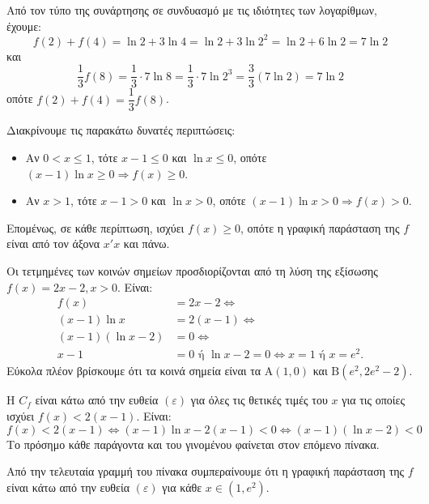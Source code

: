 \begin{alist}
\item Από τον τύπο της συνάρτησης σε συνδυασμό με τις ιδιότητες των λογαρίθμων, έχουμε:
\[f(2) + f(4) = \ln 2 + 3\ln 4 = \ln 2 + 3\ln 2^2 = \ln 2 + 6\ln 2 = 7\ln 2\]
και
\[\frac{1}{3}f(8) = \frac{1}{3}\cdot 7\ln 8 = \frac{1}{3}\cdot 7\ln 2^3 = \frac{3}{3}(7\ln 2) = 7\ln 2\]
οπότε $f(2) + f(4) = \dfrac{1}{3}f(8)$.
\item Διακρίνουμε τις παρακάτω δυνατές περιπτώσεις:
\begin{itemize}
    \item Αν $0 < x \le 1$, τότε $x - 1 \le 0$ και $\ln x \le 0$, οπότε $(x - 1)\ln x \ge 0 \Rightarrow f(x) \ge 0$.
    \item Αν $x > 1$, τότε $x - 1 > 0$ και $\ln x > 0$, οπότε $(x - 1)\ln x > 0 \Rightarrow f(x) > 0$.
\end{itemize}
Επομένως, σε κάθε περίπτωση, ισχύει $f(x) \ge 0$, οπότε η γραφική παράσταση της $f$ είναι από τον άξονα $x'x$ και πάνω.
\item 
\begin{rlist}
\item Οι τετμημένες των κοινών σημείων προσδιορίζονται από τη λύση της εξίσωσης $f(x) = 2x - 2, x > 0$. Είναι:
\begin{align*}
f(x) &= 2x - 2 \Leftrightarrow \\
(x - 1)\ln x &= 2(x - 1) \Leftrightarrow \\
(x - 1)(\ln x - 2) &= 0 \Leftrightarrow \\
x - 1 &= 0 \text{ ή } \ln x - 2 = 0 \Leftrightarrow x = 1 \text{ ή } x = e^2.
\end{align*}
Εύκολα πλέον βρίσκουμε ότι τα κοινά σημεία είναι τα $\text{A}(1,0)$ και $\text{B}(e^2, 2e^2 - 2)$.
\item Η $C_f$ είναι κάτω από την ευθεία $(\varepsilon)$ για όλες τις θετικές τιμές του $x$ για τις οποίες ισχύει $f(x) < 2(x - 1)$. Είναι:
\[f(x) < 2(x - 1) \Leftrightarrow (x - 1)\ln x - 2(x - 1) < 0 \Leftrightarrow (x - 1)(\ln x - 2) < 0\]
Το πρόσημο κάθε παράγοντα και του γινομένου φαίνεται στον επόμενο πίνακα.
\begin{center}
\end{center}
Από την τελευταία γραμμή του πίνακα συμπεραίνουμε ότι η γραφική παράσταση της $f$ είναι κάτω από την ευθεία $(\varepsilon)$ για κάθε $x \in (1, e^2)$.
\end{rlist}
\end{alist}

